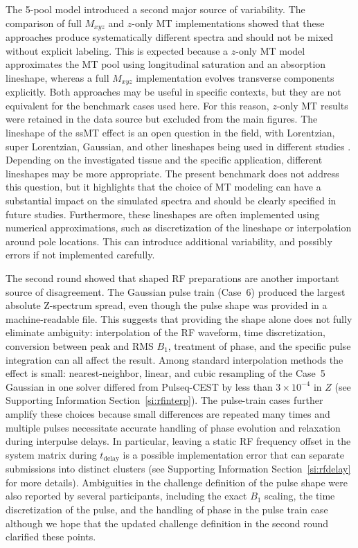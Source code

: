 \documentclass[11pt,a4paper]{article}
\begin{document}
The 5-pool model introduced a second major source of variability. The comparison of full $M_{xyz}$ and $z$-only MT implementations showed that these approaches produce systematically different spectra and should not be mixed without explicit labeling. This is expected because a $z$-only MT model approximates the MT pool using longitudinal saturation and an absorption lineshape, whereas a full $M_{xyz}$ implementation evolves transverse components explicitly. Both approaches may be useful in specific contexts, but they are not equivalent for the benchmark cases used here. For this reason, $z$-only MT results were retained in the data source but excluded from the main figures. 
The lineshape of the ssMT effect is an open question in the field, with Lorentzian, super Lorentzian, Gaussian, and other lineshapes being used in different studies \cite{Asslnder2022}. Depending on the investigated tissue and the specific application, different lineshapes may be more appropriate. The present benchmark does not address this question, but it highlights that the choice of MT modeling can have a substantial impact on the simulated spectra and should be clearly specified in future studies.
Furthermore, these lineshapes are often implemented using numerical approximations, such as discretization of the lineshape or interpolation around pole locations.
This can introduce additional variability, and possibly errors if not implemented carefully. 

The second round showed that shaped RF preparations are another important source of disagreement. The Gaussian pulse train (Case~6) produced the largest absolute Z-spectrum spread, even though the pulse shape was provided in a machine-readable file. This suggests that providing the shape alone does not fully eliminate ambiguity: interpolation of the RF waveform, time discretization, conversion between peak and RMS $B_1$, treatment of phase, and the specific pulse integration can all affect the result.
Among standard interpolation methods the effect is small: nearest-neighbor, linear, and cubic resampling of the Case~5 Gaussian in one solver differed from Pulseq-CEST by less than $3\times10^{-4}$ in $Z$ (see Supporting Information Section~\ref{si:rfinterp}).
The pulse-train cases further amplify these choices because small differences are repeated many times and multiple pulses necessitate accurate handling of phase evolution and relaxation during interpulse delays.
In particular, leaving a static RF frequency offset in the system matrix during $t_{\mathrm{delay}}$ is a possible implementation error that can separate submissions into distinct clusters (see Supporting Information Section~\ref{si:rfdelay} for more details).
Ambiguities in the challenge definition of the pulse shape were also reported by several participants, including the exact $B_1$ scaling, the time discretization of the pulse, and the handling of phase in the pulse train case although we hope that the updated challenge definition in the second round clarified these points.
\end{document}
